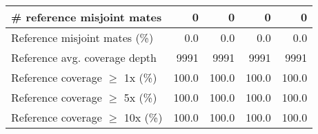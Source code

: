 \documentclass[12pt,a4paper]{article}
\begin{document}
\begin{table}[ht]
\begin{center}
\begin{tabular}{|l*{4}{|r}|}
\# reference misjoint mates & 0 & 0 & 0 & 0 \\ \hline
Reference misjoint mates (\%) & 0.0 & 0.0 & 0.0 & 0.0 \\ \hline
Reference avg. coverage depth & 9991 & 9991 & 9991 & 9991 \\ \hline
Reference coverage $\geq$ 1x (\%) & 100.0 & 100.0 & 100.0 & 100.0 \\ \hline
Reference coverage $\geq$ 5x (\%) & 100.0 & 100.0 & 100.0 & 100.0 \\ \hline
Reference coverage $\geq$ 10x (\%) & 100.0 & 100.0 & 100.0 & 100.0 \\ \hline
\end{tabular}
\end{center}
\end{table}
\end{document}
